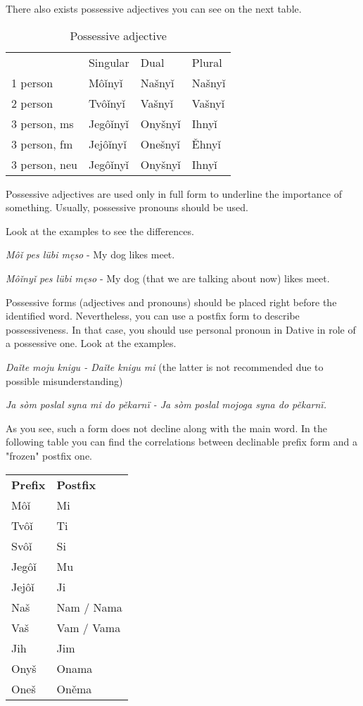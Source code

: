 There also exists possessive adjectives you can see on the next table.

\begin{table}[!htb]
	\caption{Possessive adjective}
	\begin{tabular}{llll}
		& Singular & Dual & Plural \\
		1 person & Môǐnyǐ & Našnyǐ & Našnyǐ \\
		2 person & Tvôǐnyǐ & Vašnyǐ & Vašnyǐ \\
		3 person, ms & Jegôǐnyǐ & Onyšnyǐ & Ihnyǐ \\
		3 person, fm & Jejôǐnyǐ & Onešnyǐ & Ěhnyǐ \\
		3 person, neu & Jegôǐnyǐ & Onyšnyǐ & Ihnyǐ
	\end{tabular}
\end{table}

Possessive adjectives are used only in full form to underline the importance of something. Usually, possessive pronouns should be used.

Look at the examples to see the differences.

\textit{Môǐ pes lübi męso} - My dog likes meet.

\textit{Môǐnyǐ pes lübi męso} - My dog (that we are talking about now) likes meet.

Possessive forms (adjectives and pronouns) should be placed right before the identified word. Nevertheless, you can use a postfix form to describe possessiveness. In that case, you should use personal pronoun in Dative in role of a possessive one. Look at the examples.

\textit{Daǐte moju knigu - Daǐte knigu mi} (the latter is not recommended due to possible misunderstanding)

\textit{Ja  sòm poslal syna mi do pěkarnï - Ja sòm poslal mojoga syna do pěkarnï.}

As you see, such a form does not decline along with the main word. In the following table you can find the correlations between declinable prefix form and a "frozen" postfix one.

\begin{table}[!htb]
	\begin{tabular}{ll}
		\textbf{Prefix} & \textbf{Postfix} \\
		Môǐ & Mi \\
		Tvôǐ & Ti \\
		Svôǐ & Si \\
		Jegôǐ & Mu \\
		Jejôǐ & Ji \\
		Naš & Nam / Nama \\
		Vaš & Vam / Vama \\
		Jih & Jim \\
		Onyš & Onama \\
		Oneš & Oněma \\
	\end{tabular}
\end{table}

